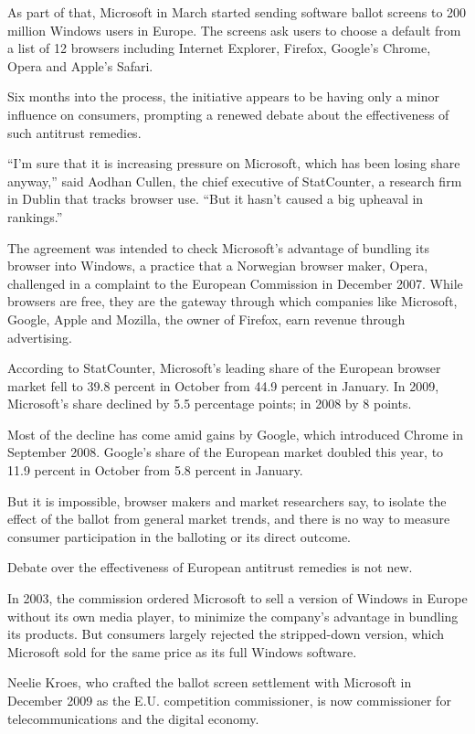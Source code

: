 ﻿\documentclass[12pt]{article}
\begin{document}
As part of that, Microsoft in March started sending software ballot screens to 200 million Windows
users in Europe. The screens ask users to choose a default from a list of 12 browsers including
Internet Explorer, Firefox, Google's Chrome, Opera and Apple's Safari.

Six months into the process, the initiative appears to be having only a minor influence on
consumers, prompting a renewed debate about the effectiveness of such antitrust remedies.

``I'm sure that it is increasing pressure on Microsoft, which has been losing share anyway,'' said
Aodhan Cullen, the chief executive of StatCounter, a research firm in Dublin that tracks browser
use. ``But it hasn't caused a big upheaval in rankings.''

The agreement was intended to check Microsoft's advantage of bundling its browser into Windows, a
practice that a Norwegian browser maker, Opera, challenged in a complaint to the European Commission
in December 2007. While browsers are free, they are the gateway through which companies like
Microsoft, Google, Apple and Mozilla, the owner of Firefox, earn revenue through advertising.

According to StatCounter, Microsoft's leading share of the European browser market fell to 39.8
percent in October from 44.9 percent in January. In 2009, Microsoft's share declined by 5.5
percentage points; in 2008 by 8 points.

Most of the decline has come amid gains by Google, which introduced Chrome in September 2008.
Google's share of the European market doubled this year, to 11.9 percent in October from 5.8 percent
in January.

But it is impossible, browser makers and market researchers say, to isolate the effect of the ballot
from general market trends, and there is no way to measure consumer participation in the balloting
or its direct outcome.

Debate over the effectiveness of European antitrust remedies is not new.

In 2003, the commission ordered Microsoft to sell a version of Windows in Europe without its own
media player, to minimize the company's advantage in bundling its products. But consumers largely
rejected the stripped-down version, which Microsoft sold for the same price as its full Windows
software.

Neelie Kroes, who crafted the ballot screen settlement with Microsoft in December 2009 as the E.U.
competition commissioner, is now commissioner for telecommunications and the digital economy.
\end{document}
